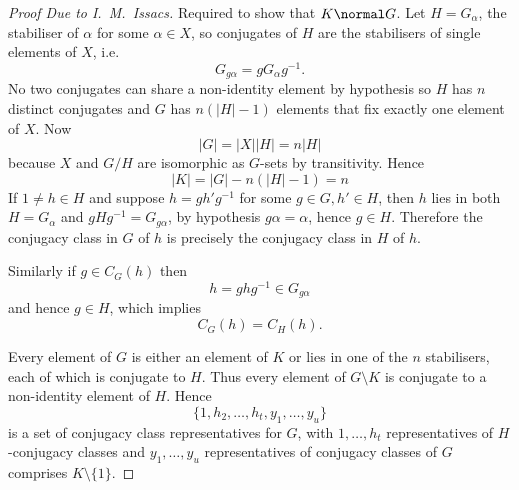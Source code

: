 \documentclass[a4paper]{article}
\theoremstyle{definition}
\begin{document}
\begin{proof}[Proof Due to I.\ M.\ Issacs]
  Required to show that \(K \normal G\). Let \(H = G_\alpha\), the stabiliser of \(\alpha\) for some \(\alpha \in X\), so conjugates of \(H\) are the stabilisers of single elements of \(X\), i.e.
  \[
    G_{g\alpha} = g G_\alpha g^{-1}.
  \]
  No two conjugates can share a non-identity element by hypothesis so \(H\) has \(n\) distinct conjugates and \(G\) has \(n (|H| - 1)\) elements that fix exactly one element of \(X\). Now
  \[
    |G| = |X| |H| = n |H|
  \]
  because \(X\) and \(G/H\) are isomorphic as \(G\)-sets by transitivity. Hence
  \[
    |K| = |G| - n (|H| - 1) = n
  \]
  If \(1 \neq h \in H\) and suppose \(h = g h' g^{-1}\) for some \(g \in G, h' \in H\), then \(h\) lies in both \(H = G_\alpha\) and \(gHg^{-1} = G_{g\alpha}\), by hypothesis \(g\alpha = \alpha\), hence \(g \in H\). Therefore the conjugacy class in \(G\) of \(h\) is precisely the conjugacy class in \(H\) of \(h\).

  Similarly if \(g \in C_G(h)\) then
  \[
    h = ghg^{-1} \in G_{g\alpha}
  \]
  and hence \(g \in H\), which implies
  \[
    C_G(h) = C_H(h).
  \]

  Every element of \(G\) is either an element of \(K\) or lies in one of the \(n\) stabilisers, each of which is conjugate to \(H\). Thus every element of \(G \setminus K\) is conjugate to a non-identity element of \(H\). Hence
  \[
    \{1, h_2, \dots, h_t, y_1, \dots, y_u\}
  \]
  is a set of conjugacy class representatives for \(G\), with \(1, \dots, h_t\) representatives of \(H\)-conjugacy classes and \(y_1, \dots, y_u\) representatives of conjugacy classes of \(G\) comprises \(K \setminus \{1\}\).


\end{proof}
\end{document}
